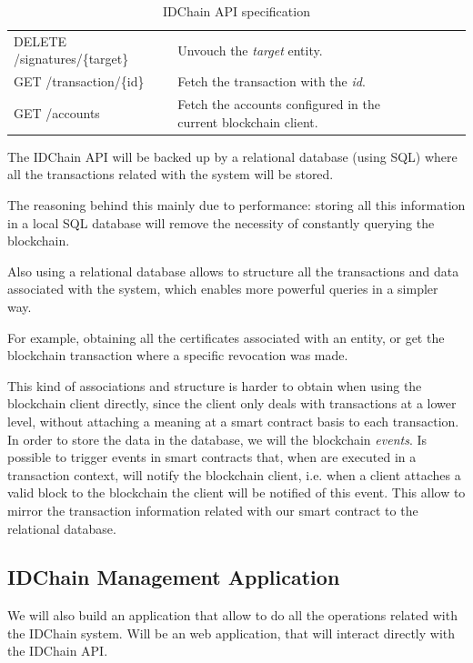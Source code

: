 {\begin{table}[h]
\begin{tabular}{|l|l|lll}
    DELETE /signatures/\{target\}   & Unvouch the \textit{target} entity.                      &  &  &  \\ \cline{1-2}

    GET /transaction/\{id\}         & Fetch the transaction with the \textit{id}.                      &  &  &  \\ \cline{1-2}

    GET /accounts                   & Fetch the accounts configured in the current blockchain client.                        &  &  & \\ \cline{1-2}
  \end{tabular}%
  \caption{IDChain API specification}
\label{table:idchain-api-spec}
\end{table}

The IDChain API will be backed up by a relational database (using \ac{SQL}) where all the transactions related with the system will be stored.

The reasoning behind this mainly due to performance: storing all this information in a local \ac{SQL} database will remove the necessity of constantly querying the blockchain.

Also using a relational database allows to structure all the transactions and data associated with the system, which enables more powerful queries in a simpler way.

For example, obtaining all the certificates associated with an entity, or get the blockchain transaction where a specific revocation was made.

This kind of associations and structure is harder to obtain when using the blockchain client directly, since the client only deals with transactions at a lower level, without attaching a meaning at a smart contract basis to each transaction.
In order to store the data in the database, we will the blockchain \textit{events}.
Is possible to trigger events in smart contracts that, when are executed in a transaction context, will notify the blockchain client, i.e. when a client attaches a valid block to the blockchain the client will be notified of this event.
This allow to mirror the transaction information related with our smart contract to the relational database.

\subsection{IDChain Management Application}
\label{subsection:idchain-app}

We will also build an application that allow to do all the operations related with the IDChain system.
Will be an web application, that will interact directly with the IDChain API.

}
